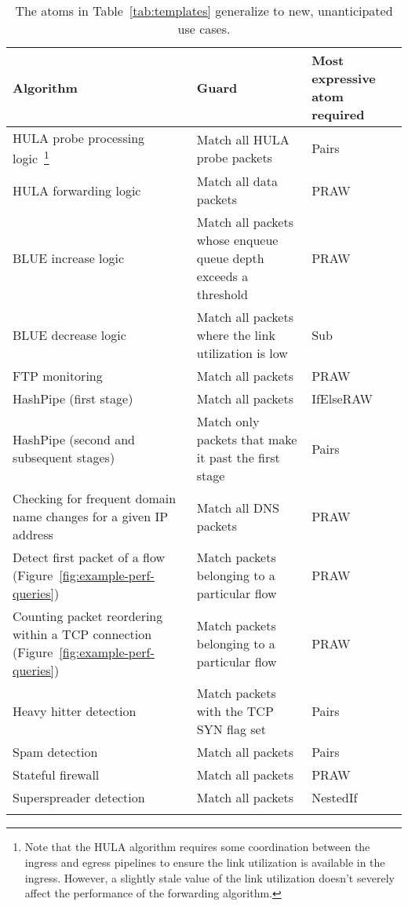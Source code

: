 \begin{table}[!t]
\centering
\begin{small}
  \begin{tabular}{|p{}|p{} | p{}}
\hline
Algorithm & Guard & Most expressive atom required\\
\hline
HULA probe processing logic~\cite{hula}\footnote{Note that the HULA algorithm
requires some coordination between the ingress and egress pipelines to ensure
the link utilization is available in the ingress. However, a slightly stale
value of the link utilization doesn't severely affect the performance of the
forwarding algorithm.} & Match all HULA probe packets & Pairs \\
\hline
HULA forwarding logic~\cite{hula} & Match all data packets & PRAW \\
\hline
BLUE increase logic~\cite{blue} & Match all packets whose enqueue queue depth exceeds a threshold & PRAW \\
\hline
BLUE decrease logic~\cite{blue} & Match all packets where the link utilization is low & Sub \\
\hline
FTP monitoring~\cite{snap} & Match all packets & PRAW \\
\hline
HashPipe (first stage)~\cite{hashpipe} & Match all packets & IfElseRAW \\
\hline
HashPipe (second and subsequent stages)~\cite{hashpipe} & Match only packets that make it past the first stage & Pairs\\
\hline
Checking for frequent domain name changes for a given IP address~\cite{snap} & Match all DNS packets & PRAW \\
\hline
Detect first packet of a flow (Figure~\ref{fig:example-perf-queries}) & Match packets belonging to a particular flow & PRAW \\
\hline
Counting packet reordering within a TCP connection (Figure~\ref{fig:example-perf-queries}) & Match packets belonging to a particular flow & PRAW \\
\hline
Heavy hitter detection~\cite{snap} & Match packets with the TCP SYN flag set & Pairs \\
\hline
Spam detection~\cite{snap} & Match all packets & Pairs \\
\hline
Stateful firewall~\cite{snap} & Match all packets & PRAW \\
\hline
Superspreader detection~\cite{snap} & Match all packets & NestedIf \\
\hline
\caption{The atoms in Table~\ref{tab:templates} generalize to new, unanticipated use cases.}
\label{tab:atoms_generalize}
\end{tabular}
\end{small}
\end{table}
